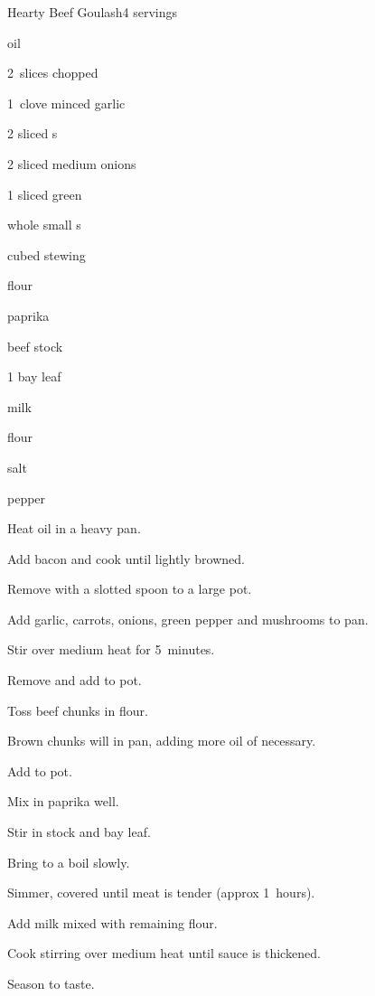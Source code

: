 \begin{recipe}{Hearty Beef Goulash}{}{4 servings}

\begin{ingredients}
\item {} oil
\item 2~slices chopped 
\item 1~clove minced garlic
\item 2 sliced s
\item 2 sliced medium onions
\item 1 sliced green 
\item \lbs{\quarter} whole small s
\item \lbs{1\half} cubed stewing 
\item \C{\quarter} flour
\item {}paprika
\item {} beef stock
\item 1 bay leaf
\item {} milk
\item {} flour
\item salt
\item pepper
\end{ingredients}

\begin{directions}
\item Heat oil in a heavy pan.
\item Add bacon and cook until lightly browned.
\item Remove with a slotted spoon to a large pot.
\item Add garlic, carrots, onions, green pepper and mushrooms to pan.
\item Stir over medium heat for 5~minutes.
\item Remove and add to pot.
\item Toss beef chunks in flour.
\item Brown chunks will in pan, adding more oil of necessary.
\item Add to pot.
\item Mix in paprika well.
\item Stir in stock and bay leaf.
\item Bring to a boil slowly.
\item Simmer, covered until meat is tender (approx 1\half~hours).
\item Add milk mixed with remaining flour.
\item Cook stirring over medium heat until sauce is thickened.
\item Season to taste.
\end{directions}

\end{recipe}
